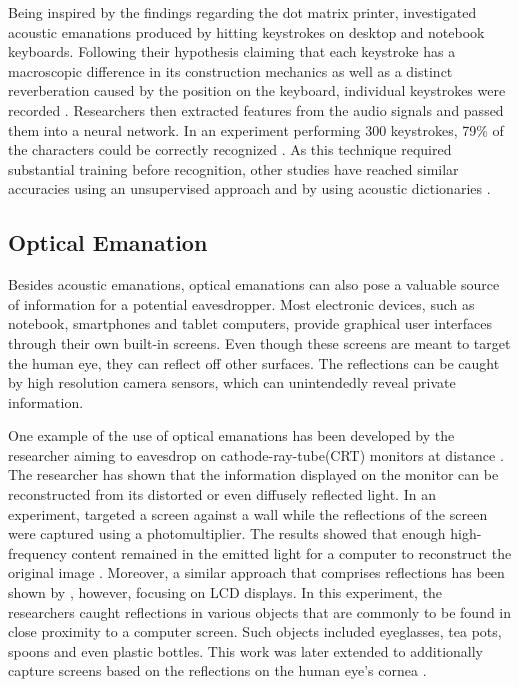 Being inspired by the findings regarding the dot matrix printer, \citeauthor{1301311} investigated acoustic emanations produced by hitting keystrokes on desktop and notebook keyboards. Following their hypothesis claiming that each keystroke has a macroscopic difference in its construction mechanics as well as a distinct reverberation caused by the position on the keyboard, individual keystrokes were recorded \cite{1301311}. Researchers then extracted features from the audio signals and passed them into a neural network. In an experiment performing 300 keystrokes, 79\% of the characters could be correctly recognized \cite{1301311}. As this technique required substantial training before recognition, other studies have reached similar accuracies using an unsupervised approach \cite{Zhuang:2009:KAE:1609956.1609959} and by using acoustic dictionaries \cite{Berger:2006:DAU:1180405.1180436}.

\subsection{Optical Emanation}
Besides acoustic emanations, optical emanations can also pose a valuable source of information for a potential eavesdropper. Most electronic devices, such as notebook, smartphones and tablet computers, provide graphical user interfaces through their own built-in screens. Even though these screens are meant to target the human eye, they can reflect off other surfaces. The reflections can be caught by high resolution camera sensors, which can unintendedly reveal private information.

One example of the use of optical emanations has been developed by the researcher \citeauthor{1004358} aiming to eavesdrop on cathode-ray-tube(CRT) monitors at distance \cite{1004358}. The researcher has shown that the information displayed on the monitor can be reconstructed from its distorted or even diffusely reflected light. In an experiment, \citeauthor{1004358} targeted a screen against a wall while the reflections of the screen were captured using a photomultiplier. The results showed that enough high-frequency content remained in the emitted light for a computer to reconstruct the original image \cite{1004358}. Moreover, a similar approach that comprises reflections has been shown by \citeauthor{4531151}, however, focusing on LCD displays. In this experiment, the researchers caught reflections in various objects that are commonly to be found in close proximity to a computer screen. Such objects included eyeglasses, tea pots, spoons and even plastic bottles. This work was later extended to additionally capture screens based on the reflections on the human eye's cornea \cite{5207653}.


